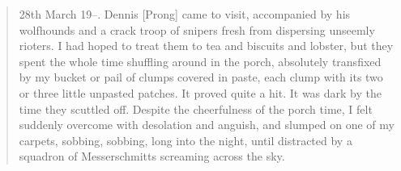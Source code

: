 \begin{quotation}
28th March 19--. Dennis [Prong] came to visit, accompanied by his wolfhounds and a crack troop of snipers fresh from dispersing unseemly rioters. I had hoped to treat them to tea and biscuits and lobster, but they spent the whole time shuffling around in the porch, absolutely transfixed by my bucket or pail of clumps covered in paste, each clump with its two or three little unpasted patches. It proved quite a hit. It was dark by the time they scuttled off. Despite the cheerfulness of the porch time, I felt suddenly overcome with desolation and anguish, and slumped on one of my carpets, sobbing, sobbing, long into the night, until distracted by a squadron of Messerschmitts screaming across the sky.
\end{quotation}